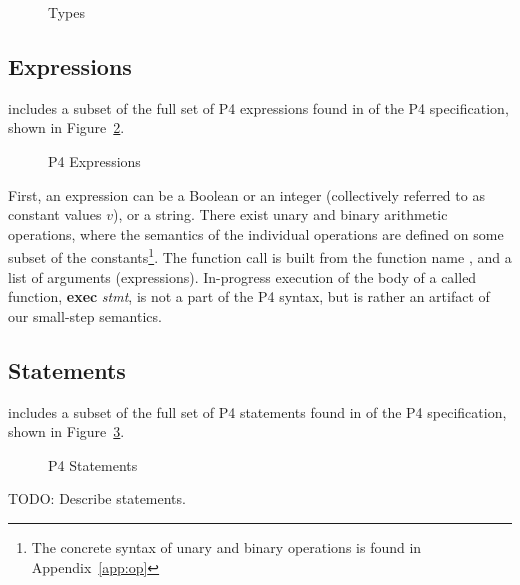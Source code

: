 \documentclass[UTF8]{article}
\begin{document}
\begin{figure}[h!]
\centering\ottgrammartabular{
\ottt\ottinterrule
}
\caption{Types}
\label{fig:types}
\end{figure}

\newpage
\subsection{Expressions}
\newcommand{\fmap}{\textit{F}}

\pfott{} includes a subset of the full set of P4 expressions found in {} of the P4 specification, shown in Figure~\ref{fig:exp}.

\begin{figure}[h!]
\centering\ottgrammartabular{
\otte\ottafterlastrule
}
\caption{P4 Expressions}
\label{fig:exp}
\end{figure}
\newcommand{\stmt}{\textit{stmt}}
\newcommand{\cval}{\ensuremath{v}}
\newcommand{\fexec}[1]{\textbf{exec}\,\,#1}

First, an expression can be a Boolean or an integer (collectively referred to as constant values \cval{}), or a string. There exist unary and binary arithmetic operations, where the semantics of the individual operations are defined on some subset of the constants\footnote{The concrete syntax of unary and binary operations is found in Appendix~\ref{app:op}}. The function call is built from the function name \fn{}, and a list of arguments (expressions). In-progress execution of the body of a called function, \fexec{\stmt{}}, is not a part of the P4 syntax, but is rather an artifact of our small-step semantics.

\newpage
\subsection{Statements}

\label{ssec:stmt}
\pfott{} includes a subset of the full set of P4 statements found in  of the P4 specification, shown in Figure~\ref{fig:stmt}.

\begin{figure}[h!]
\centering\ottgrammartabular{
\ottstmt\ottafterlastrule
}
\caption{P4 Statements}
\label{fig:stmt}
\end{figure}

TODO: Describe statements.

\newpage
\newcommand{\exstate}{\ensuremath{s}}
\newcommand{\scope}{\ensuremath{\mathit{scope}}}
\newcommand{\stacks}{\ensuremath{\sigma}}
\newcommand{\currsf}{\ensuremath{\varepsilon}}
\newcommand{\gscope}{\ensuremath{{\gamma}_G}}
\newcommand{\escope}{\ensuremath{{\gamma}_{\emptyset}}}
\newcommand{\cstack}{E}
\newcommand{\status}{\ensuremath{t}}
\newcommand{\running}{\textbf{R}}
\newcommand{\returnst}[1]{\ensuremath{\textbf{Ret}\,\,#1}}
\newcommand{\accept}{\textbf{Accept}}
\newcommand{\reject}[1]{\textbf{Reject} #1}
\newcommand{\trans}[1]{\textbf{Trans} #1}
\newcommand{\sterr}{\ensuremath{\bot}}
\newcommand{\pfin}{\ensuremath{p_{\mathrm{fin}}}}
\end{document}
